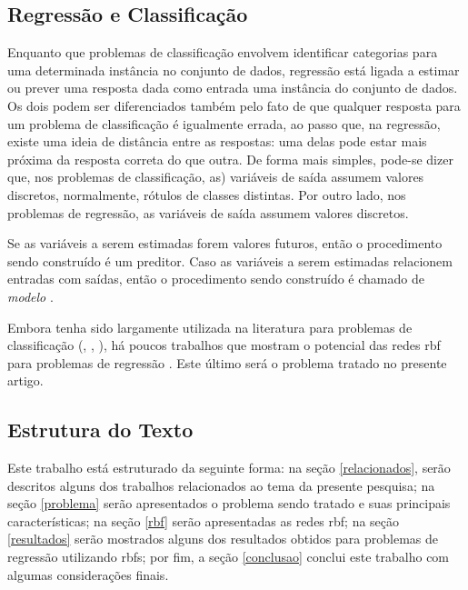 \documentclass[conference]{IEEEtran}
\begin{document}
\subsection{Regressão e Classificação}
\label{regressaoxclassificacao}

Enquanto que problemas de classificação envolvem identificar categorias para 
uma determinada instância no conjunto de dados, regressão está ligada a estimar 
ou prever uma resposta dada como entrada uma instância do conjunto de dados. 
Os dois podem ser diferenciados também pelo fato de que qualquer resposta 
para um problema de classificação é igualmente errada, ao passo que, na 
regressão, existe uma ideia de distância entre as respostas: uma delas pode 
estar mais próxima da resposta correta do que outra. De forma mais simples, 
pode-se dizer que, nos problemas de classificação, as) variáveis de saída 
assumem valores discretos, normalmente, rótulos de classes distintas. Por outro 
lado, nos problemas de regressão, as variáveis de saída assumem valores 
discretos.

Se as variáveis a serem estimadas forem valores futuros, então o procedimento 
sendo construído é um preditor. Caso as variáveis a serem estimadas relacionem 
entradas com saídas, então o procedimento sendo construído é chamado de 
\textit{modelo} \cite{specht1991general}.

Embora tenha sido largamente utilizada na literatura para problemas de 
classificação (\cite{heartrbf}, \cite{wu2012using}, 
\cite{DBLP:conf/isnn/ZhaoYWWL06}), há poucos trabalhos que mostram o potencial 
das redes \ac*{rbf} para problemas de regressão \cite{rojas2002time}. Este 
último será o problema tratado no presente artigo.

\subsection{Estrutura do Texto}
\label{estrutura}

Este trabalho está estruturado da seguinte forma: na seção \ref{relacionados}, 
serão descritos alguns dos trabalhos relacionados ao tema da presente pesquisa; 
na seção \ref{problema} serão apresentados o problema sendo tratado e suas 
principais características; na seção \ref{rbf} serão apresentadas as redes 
\ac*{rbf}; na seção \ref{resultados} serão mostrados alguns dos resultados 
obtidos para problemas de regressão utilizando \acp*{rbf}; por fim, a seção 
\ref{conclusao} conclui este trabalho com algumas considerações finais.
\end{document}
